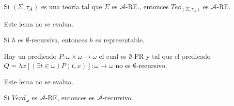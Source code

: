   \begin{lemma} \label{lemma_113}
    \PN Si $(\Sigma, \tau_{A})$ es una teoría tal que $\Sigma$ es $\mathcal{A}$-RE., entonces $Teo_{(\Sigma, \tau_{A})}$
    es $\mathcal{A}$-RE.
  \end{lemma}

  \begin{lemma}
    \PN Este lema no se evalua.
  \end{lemma}

  \begin{proposition} \label{proposition_115}
    \PN Si $h$ es $\emptyset$-recursiva, entonces $h$ es representable.
  \end{proposition}

  \begin{lemma} \label{lemma_116}
    \PN Hay un predicado $P: \omega \times \omega \rightarrow \omega$ el cual es $\emptyset$-PR y tal que el predicado
    $Q = \lambda x\left[(\exists t \in \omega) P(t, x)\right]: \omega \rightarrow \omega$ no es $\emptyset$-recursivo.
  \end{lemma}

  \begin{lemma}
    \PN Este lema no se evalua.
  \end{lemma}

  \begin{lemma} \label{lemma_118}
    \PN Si $Verd_{\mathbf{\omega}}$ es $\mathcal{A}$-RE, entonces es $\mathcal{A}$-recursivo.
  \end{lemma}

